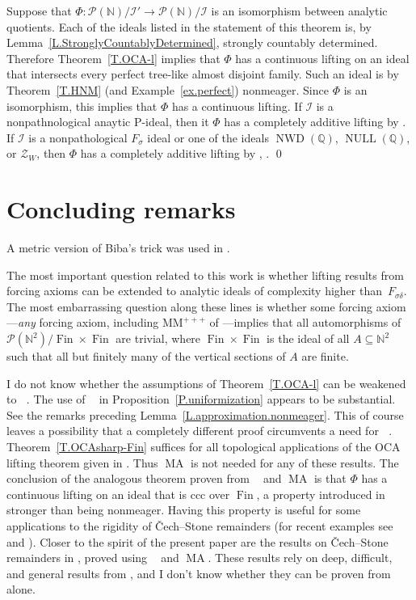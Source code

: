 \documentclass{amsart}
\makeatletter
\def\Fin{{\rm Fin}}   %
\def\text{\mbox}
\theoremstyle{definition}
\theoremstyle{remark}
\def\Fin{\operatorname{Fin}}
\renewcommand{\proofname}{Proof}
\renewenvironment{proof}[1][\proofname]{\par
\let\oldqedsymbol\qedsymbol             %
  \normalfont
  \topsep6\p@\@plus6\p@ \trivlist
  \item[\hskip\labelsep\hskip\parindent\scshape
    #1\@addpunct{.}]\ignorespaces
}{%
  \qed\endtrivlist
\global\let\qedsymbol\oldqedsymbol      %
}
\newcommand{\cP}{\mathcal P}
\newcommand{\bbN}{\mathbb N}
\newcommand{\bbQ}{\mathbb Q}
\newcommand{\cI}{{\mathcal I}} %
\newcommand{\cZ}{\mathcal Z}
\DeclareMathOperator{\OCAT}{OCA_T}
\DeclareMathOperator{\NWD}{NWD}
\DeclareMathOperator{\NULL}{NULL}
\DeclareMathOperator{\MA}{MA}
\DeclareMathOperator{\MAsigma}{MA(\sigma-\text{linked})}
\newcommand{\cPN}{\cP(\bbN)}
\numberwithin{claim}{subsection}
\makeatother
\begin{document}
\begin{proof}[Proof of Theorem~\ref{T.Main}] Suppose that $\Phi\colon \cPN/\cI'\to \cPN/\cI$ is an isomorphism between analytic quotients. Each of the ideals listed in the statement of this theorem is, by Lemma~\ref{L.StronglyCountablyDetermined}, strongly countably determined. Therefore Theorem~\ref{T.OCA-l} implies that $\Phi$ has a continuous lifting on an ideal that intersects every perfect tree-like almost disjoint family. Such an ideal is by Theorem~\ref{T.HNM} (and Example~\ref{ex.perfect}) nonmeager.  Since $\Phi$ is an isomorphism, this implies that $\Phi$ has a continuous lifting. If $\cI$ is a nonpathnological  anaytic P-ideal, then it $\Phi$ has a completely additive lifting by \cite[Theorem~1.9.1]{Fa:AQ}. If $\cI$ is a nonpathological $F_\sigma$ ideal or one of the ideals $\NWD(\bbQ)$, $\NULL(\bbQ)$, or $\cZ_W$, then $\Phi$ has a completely additive lifting by \cite{KanRe:New}, \cite{KanRe:Ulam}. 
\end{proof}
\section{Concluding remarks}

A metric version of Biba's trick was used in \cite[Proposition~2.10]{de2024metric}. 

The most important question related to this work is whether lifting results from forcing axioms can be extended to analytic ideals of complexity higher than~$F_{\sigma\delta}$. The most embarrassing question along these lines is whether some forcing axiom---\emph{any} forcing axiom, including $\textrm{MM}^{+++}$ of \cite{Viale:Category}---implies that all automorphisms of $\cP(\bbN^2)/\Fin\times\Fin$ are trivial, where $\Fin\times\Fin$ is the ideal of all $A\subseteq \bbN^2$ such that  all but finitely many of the vertical sections of $A$ are finite. 

I do not know whether the assumptions of Theorem~\ref{T.OCA-l}  can be weakened to $\OCAT$.  The use of $\MAsigma$ in Proposition~\ref{P.uniformization} appears to be substantial. See the remarks preceding   Lemma~\ref{L.approximation.nonmeager}. This of course leaves a possibility that a completely different proof circumvents a need for $\MAsigma$. 
Theorem~\ref{T.OCAsharp-Fin} suffices for all topological applications of the OCA lifting theorem given in \cite[\S 4]{Fa:AQ}. Thus $\MA$ is not needed for any of these results. The conclusion of the analogous theorem proven from $\OCAT$ and $\MA$ is that $\Phi$ has a continuous lifting on an ideal that is ccc over $\Fin$, a property introduced in \cite{Fa:AQ} stronger than being nonmeager. Having this property is useful for some applications  to the rigidity of \v Cech--Stone remainders (for recent examples see  \cite{dow2024autohomeomorphisms} and \cite{dow2024non}). Closer to the spirit of the present paper are the results on \v Cech--Stone remainders in \cite{vignati2024weak}, proved using $\OCAT$ and $\MA$. These results rely on deep, difficult, and general results from \cite{vignati2022rigidity}, and I don't know whether they can be proven from $\OCAT$ alone. 
\end{document}
